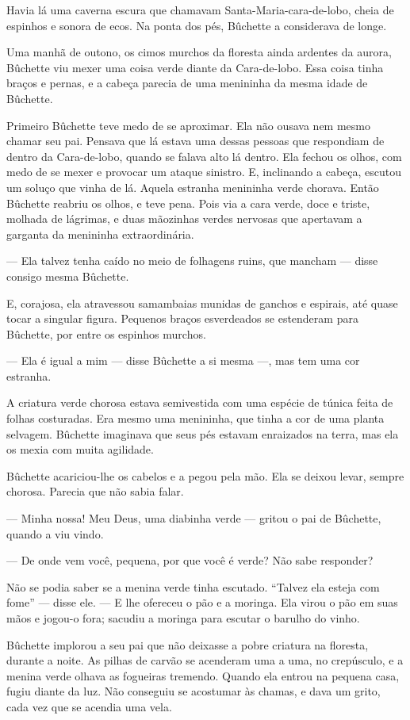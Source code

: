 Havia lá uma caverna escura que chamavam Santa-Maria-cara-de-lobo,
cheia de espinhos e sonora de ecos. Na ponta dos pés, Bûchette
a considerava de longe.

Uma manhã de outono, os cimos murchos da floresta ainda ardentes da
aurora, Bûchette viu mexer uma coisa verde diante da Cara-de-lobo. Essa
coisa tinha braços e pernas, e a cabeça parecia de uma menininha da mesma
idade de Bûchette.

Primeiro Bûchette teve medo de se aproximar. Ela não ousava nem
mesmo chamar seu pai. Pensava que lá estava uma dessas pessoas que
respondiam de dentro da Cara-de-lobo, quando se falava alto lá dentro. Ela
fechou os olhos, com medo de se mexer e provocar um ataque sinistro. E,
inclinando a cabeça, escutou um soluço que vinha de lá. Aquela estranha
menininha verde chorava. Então Bûchette reabriu os olhos, e teve pena.
Pois via a cara verde, doce e triste, molhada de lágrimas, e duas
mãozinhas verdes nervosas que apertavam a garganta da menininha
extraordinária.

--- Ela talvez tenha caído no meio de folhagens ruins, que mancham ---
disse consigo mesma Bûchette.

E, corajosa, ela atravessou samambaias munidas de ganchos e espirais,
até quase tocar a singular figura. Pequenos braços esverdeados se
estenderam para Bûchette, por entre os espinhos murchos.

--- Ela é igual a mim --- disse Bûchette a si mesma ---,  mas tem uma cor estranha.

A criatura verde chorosa estava semivestida com uma espécie de túnica
feita de folhas costuradas. Era mesmo uma menininha, que tinha a cor de
uma planta selvagem. Bûchette imaginava que seus pés estavam enraizados na
terra, mas ela os mexia com muita agilidade.

Bûchette acariciou-lhe os cabelos e a pegou pela mão. Ela se deixou
levar, sempre chorosa. Parecia que não sabia falar.

--- Minha nossa! Meu Deus, uma diabinha verde --- gritou o pai de Bûchette,
quando a viu vindo.

--- De onde vem você, pequena, por que você é verde? Não sabe responder?

Não se podia saber se a menina verde tinha escutado. “Talvez ela esteja
com fome” --- disse ele. --- E lhe ofereceu o pão e a moringa. Ela virou o pão em
suas mãos e jogou-o fora; sacudiu a moringa para escutar o barulho do
vinho.

Bûchette implorou a seu pai que não deixasse a pobre criatura na
floresta, durante a noite. As pilhas de carvão se acenderam uma a uma, no
crepúsculo, e a menina verde olhava as fogueiras tremendo. Quando ela
entrou na pequena casa, fugiu diante da luz. Não conseguiu se acostumar às
chamas, e dava um grito, cada vez que se acendia uma vela.
\pagebreak

